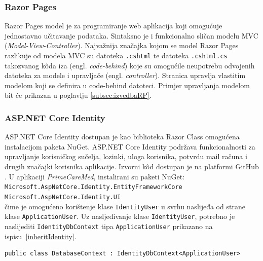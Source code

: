 \subsubsection{Razor Pages}
Razor Pages model je za programiranje web aplikacija koji omogućuje jednostavno učitavanje podataka. Sintaksno je i funkcionalno sličan modelu MVC \\(\textit{Model-View-Controller}). Najvažnija značajka kojom se model Razor Pages razlikuje od modela MVC su datoteka \texttt{.cshtml} te datoteka \texttt{.cshtml.cs} takozvanog k\^oda iza (engl. \textit{code-behind}) koje su omogućile neupotrebu odvojenih datoteka za modele i upravljače (engl. \textit{controller}). Stranica upravlja vlastitim modelom koji se definira u code-behind datoteci\cite{RazorPages}. Primjer upravljanja modelom bit će prikazan u poglavlju \ref{subsec:izvedbaRP}.

\subsubsection{ASP.NET Core Identity}
\label{subsubsec:IdentityCore}
 
ASP.NET Core Identity dostupan je kao biblioteka Razor Class omogućena instalacijom paketa NuGet.  ASP.NET Core Identity podržava funkcionalnosti za upravljanje korisničkog sučelja, lozinki, uloga korisnika, potvrdu mail računa i drugih značajki korisnika aplikacije. Izvorni k\^od dostupan je na platformi GitHub \cite{aspNETGitHub}. U aplikaciji \textit{PrimeCareMed}, instalirani su paketi NuGet:\\\texttt{Microsoft.AspNetCore.Identity.EntityFrameworkCore} \\ \texttt{Microsoft.AspNetCore.Identity.UI}  \\ čime je omogućeno korištenje klase \texttt{IdentityUser} u svrhu naslijeđa od strane klase \texttt{ApplicationUser}. Uz nasljeđivanje klase \texttt{IdentityUser}, potrebno je naslijediti \texttt{IdentityDbContext} tipa \texttt{ApplicationUser} prikazano na ispisu~\ref{inheritIdentity}.
\begin{lstlisting}[caption={Nasljeđivanje klase \texttt{IdentityDbContext}}, label=inheritIdentity]
public class DatabaseContext : IdentityDbContext<ApplicationUser>
\end{lstlisting}

